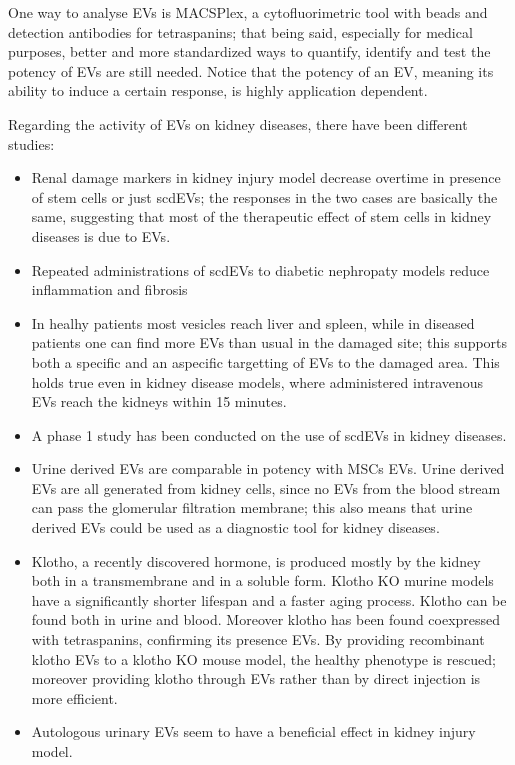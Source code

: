   One way to analyse EVs is MACSPlex, a cytofluorimetric tool with beads and detection antibodies for tetraspanins; that being said, especially for medical purposes, better and more standardized ways to quantify, identify and test the potency of EVs are still needed. Notice that the potency of an EV, meaning its ability to induce a certain response, is highly application dependent. 

  Regarding the activity of EVs on kidney diseases, there have been different studies:
  \begin{itemize}
    \item Renal damage markers in kidney injury model decrease overtime in presence of stem cells or just scdEVs; the responses in the two cases are basically the same, suggesting that most of the therapeutic effect of stem cells in kidney diseases is due to EVs.
    \item Repeated administrations of scdEVs to diabetic nephropaty models reduce inflammation and fibrosis
    \item In healhy patients most vesicles reach liver and spleen, while in diseased patients one can find more EVs than usual in the damaged site; this supports both a specific and an aspecific targetting of EVs to the damaged area. This holds true even in kidney disease models, where administered intravenous EVs reach the kidneys within 15 minutes. 
    \item A phase 1 study has been conducted on the use of scdEVs in kidney diseases. 
    \item Urine derived EVs are comparable in potency with MSCs EVs. Urine derived EVs are all generated from kidney cells, since no EVs from the blood stream can pass the glomerular filtration membrane; this also means that urine derived EVs could be used as a diagnostic tool for kidney diseases. 
    \item Klotho, a recently discovered hormone, is produced mostly by the kidney both in a transmembrane and in a soluble form. Klotho KO murine models have a significantly shorter lifespan and a faster aging process. Klotho can be found both in urine and blood. Moreover klotho has been found coexpressed with tetraspanins, confirming its presence EVs. By providing recombinant klotho EVs to a klotho KO mouse model, the healthy phenotype is rescued; moreover providing klotho through EVs rather than by direct injection is more efficient. 
    \item Autologous urinary EVs seem to have a beneficial effect in kidney injury model.

\end{itemize}
